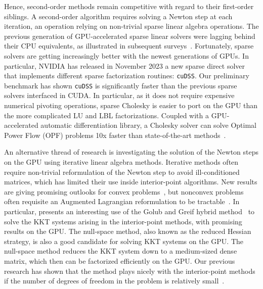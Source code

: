 Hence, second-order methods remain competitive with regard to their first-order
siblings. A second-order algorithm requires solving a Newton step at each
iteration, an operation relying on non-trivial sparse linear algebra operations.
The previous generation of GPU-accelerated sparse linear
solvers were lagging behind their CPU equivalents, as illustrated in
subsequent surveys~\cite{tasseff2019exploring,swirydowicz2021linear}.
Fortunately, sparse solvers are getting increasingly better with the newest
generations of GPUs. In particular, NVIDIA has released in November 2023
a new sparse direct solver that implements different sparse factorization routines: {\tt cuDSS}. Our
preliminary benchmark has shown {\tt cuDSS} is significantly
faster than the previous sparse solvers interfaced in CUDA.
In particular, as it does not require expensive numerical pivoting operations, sparse Cholesky
is easier to port on the GPU than the more complicated LU and LBL factorizations.
Coupled with a GPU-accelerated automatic differentiation library, a Cholesky
solver can solve Optimal Power Flow (OPF) problems 10x faster than state-of-the-art
methods~\cite{shin2023accelerating}.

An alternative thread of research is investigating the solution of the Newton steps
on the GPU using iterative linear algebra methods.
Iterative methods often require non-trivial reformulation of the Newton step to avoid
ill-conditioned matrices, which has limited their use inside interior-point
algorithms. New results are giving promising outlooks for convex problems~\cite{ghannad2022linear},
but nonconvex problems often requisite an Augmented Lagrangian reformulation
to be tractable~\cite{cao2016augmented,regev2023hykkt}. In particular,
\cite{regev2023hykkt} presents an interesting use of the Golub and Greif
hybrid method~\cite{golub2003solving} to solve the KKT systems arising in
the interior-point methods, with promising results on the GPU.
The null-space method, also known as the reduced Hessian strategy,
is also a good candidate for solving KKT systems on the GPU.
The null-space method reduces the KKT system down to
a medium-sized dense matrix, which then can be factorized efficiently on the GPU.
Our previous research has shown that the method plays nicely with the interior-point
methods if the number of degrees of freedom in the problem is relatively small~\cite{pacaud2022condensed}.

